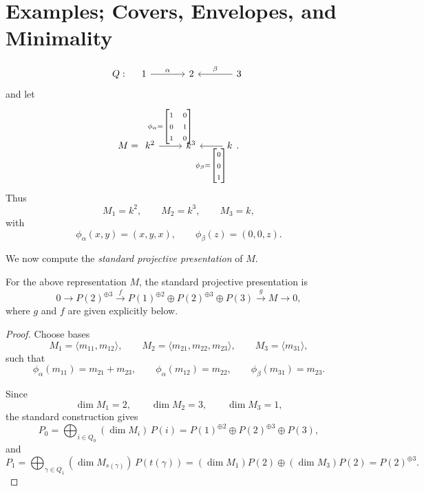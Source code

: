 \documentclass[11pt, a4paper]{report}
\begin{document}
\section{Examples; Covers, Envelopes, and Minimality}

\begin{example}
\[
Q:\quad
\begin{tikzcd}[column sep=large]
1 \arrow[r, "\alpha"] & 2 & 3 \arrow[l, "\beta"']
\end{tikzcd}
\]
and let
\[
M=
\begin{tikzcd}[ampersand replacement=\&]
k^2 \arrow[r, "{\phi_\alpha=\begin{bmatrix}1&0\\0&1\\1&0\end{bmatrix}}"] \&
k^3 \&
k \arrow[l, "{\phi_\beta=\begin{bmatrix}0\\0\\1\end{bmatrix}}"]
\end{tikzcd}.
\]
Thus
\[
M_1=k^2,\qquad M_2=k^3,\qquad M_3=k,
\]
with
\[
\phi_\alpha(x,y)=(x,y,x),\qquad \phi_\beta(z)=(0,0,z).
\]

We now compute the \emph{standard projective presentation} of \(M\).

\begin{proposition}
For the above representation \(M\), the standard projective presentation is
\[
0\longrightarrow P(2)^{\oplus 3}
\xrightarrow{\,f\,}
P(1)^{\oplus 2}\oplus P(2)^{\oplus 3}\oplus P(3)
\xrightarrow{\,g\,}
M
\longrightarrow 0,
\]
where \(g\) and \(f\) are given explicitly below.
\end{proposition}

\begin{proof}
Choose bases
\[
M_1=\langle m_{11},m_{12}\rangle,\qquad
M_2=\langle m_{21},m_{22},m_{23}\rangle,\qquad
M_3=\langle m_{31}\rangle,
\]
such that
\[
\phi_\alpha(m_{11})=m_{21}+m_{23},\qquad
\phi_\alpha(m_{12})=m_{22},\qquad
\phi_\beta(m_{31})=m_{23}.
\]

Since
\[
\dim M_1=2,\qquad \dim M_2=3,\qquad \dim M_3=1,
\]
the standard construction gives
\[
P_0=\bigoplus_{i\in Q_0} (\dim M_i)\, P(i)
   =P(1)^{\oplus 2}\oplus P(2)^{\oplus 3}\oplus P(3),
\]
and
\[
P_1=\bigoplus_{\gamma\in Q_1} (\dim M_{s(\gamma)})\,P(t(\gamma))
   =(\dim M_1)P(2)\oplus (\dim M_3)P(2)
   =P(2)^{\oplus 3}.
\]

\medskip


\end{proof}
\end{example}
\end{document}
